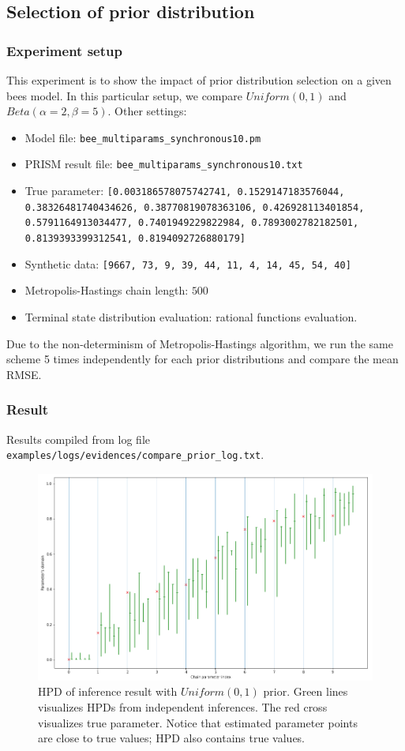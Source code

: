 \documentclass[12pt]{article}
\theoremstyle{definition}
\begin{document}
\subsection{Selection of prior distribution}
\subsubsection{Experiment setup}
This experiment is to show the impact of prior distribution selection on a given
bees model. In this particular setup, we compare $Uniform(0,1)$ and
$Beta(\alpha=2, \beta=5)$. Other settings: 
\begin{itemize}
\item Model file: \texttt{bee\_multiparams\_synchronous10.pm}
\item PRISM result file: \texttt{bee\_multiparams\_synchronous10.txt}
\item True parameter: \texttt{[0.003186578075742741, 0.1529147183576044,
    0.38326481740434626, 0.38770819078363106, 0.426928113401854,
    0.5791164913034477, 0.7401949229822984, 0.7893002782182501,
    0.8139393399312541, 0.8194092726880179]}
\item Synthetic data: \texttt{[9667, 73, 9, 39, 44, 11, 4, 14, 45, 54, 40]}
\item Metropolis-Hastings chain length: $500$
\item Terminal state distribution evaluation: rational functions evaluation.
\end{itemize}
Due to the non-determinism of Metropolis-Hastings algorithm, we run the same
scheme 5 times independently for each prior distributions and compare the mean RMSE.

\subsubsection{Result}
Results compiled from log file \texttt{examples/logs/evidences/compare\_prior\_log.txt}.\\
\begin{figure}[H]
  \centering
  \includegraphics[width=\textwidth,keepaspectratio]{figures/prior_uniform.png}
  \caption{HPD of inference result with $Uniform(0,1)$ prior. Green lines
    visualizes HPDs from independent inferences. The red cross visualizes true
    parameter. Notice that estimated parameter points are close to true values;
    HPD also contains true values.} 
\end{figure}
\end{document}
